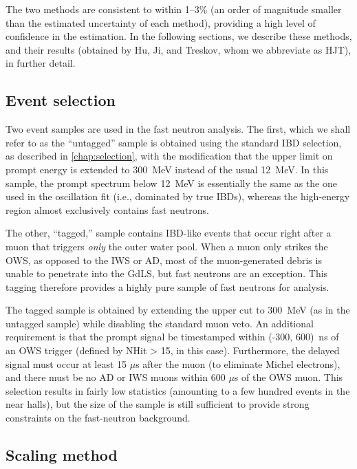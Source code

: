 \documentclass[../thesis.tex]{subfiles}
\begin{document}
The two methods are consistent to within 1--3\% (an order of magnitude smaller
than the estimated uncertainty of each method), providing a high level of
confidence in the estimation. In the following sections, we describe these
methods, and their results (obtained by Hu, Ji, and Treskov, whom we abbreviate
as HJT), in further detail.

\subsection{Event selection}
\label{sec:fastn_sel}

Two event samples are used in the fast neutron analysis. The first, which we
shall refer to as the ``untagged'' sample is obtained using the standard IBD
selection, as described in \ref{chap:selection}, with the modification that the
upper limit on prompt energy is extended to 300~MeV instead of the usual
12~MeV. In this sample, the prompt spectrum below 12~MeV is essentially the same
as the one used in the oscillation fit (i.e., dominated by true IBDs), whereas
the high-energy region almost exclusively contains fast neutrons.

The other, ``tagged,'' sample contains IBD-like events that occur right after a
muon that triggers \emph{only} the outer water pool. When a muon only strikes
the OWS, as opposed to the IWS or AD, most of the muon-generated debris is
unable to penetrate into the GdLS, but fast neutrons are an exception. This
tagging therefore provides a highly pure sample of fast neutrons for analysis.

The tagged sample is obtained by extending the upper cut to 300~MeV (as in the
untagged sample) while disabling the standard muon veto. An additional
requirement is that the prompt signal be timestamped within (-300, 600)~ns of an
OWS trigger (defined by NHit > 15, in this case). Furthermore, the delayed
signal must occur at least 15 $\mu$s after the muon (to eliminate Michel
electrons), and there must be no AD or IWS muons within 600 $\mu$s of the OWS
muon. This selection results in fairly low statistics (amounting to a few
hundred events in the near halls), but the size of the sample is still
sufficient to provide strong constraints on the fast-neutron background.

\subsection{Scaling method}
\label{sec:fastn_scaling}
\end{document}
